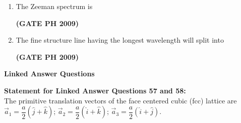 \documentclass[14pt, a4paper]{extarticle}
\begin{document}
\begin{enumerate}[label=\textbf{Q. \arabic*}, start=55]

\item The Zeeman spectrum is
\begin{enumerate}
\end{enumerate}
\hfill \textbf{(GATE PH 2009)}

\item The fine structure line having the longest wavelength will split into
\begin{enumerate}
\end{enumerate}
\hfill \textbf{(GATE PH 2009)}

\end{enumerate}


\vspace{1.5em}
\noindent
\textbf{Linked Answer Questions}
\vspace{1em}

\noindent
\textbf{Statement for Linked Answer Questions 57 and 58:} \\
The primitive translation vectors of the face centered cubic (fcc) lattice are
$\vec{a}_1 = \dfrac{a}{2}(\hat{j}+\hat{k})$; $\vec{a}_2 = \dfrac{a}{2}(\hat{i}+\hat{k})$; $\vec{a}_3 = \dfrac{a}{2}(\hat{i}+\hat{j})$.
\end{document}
